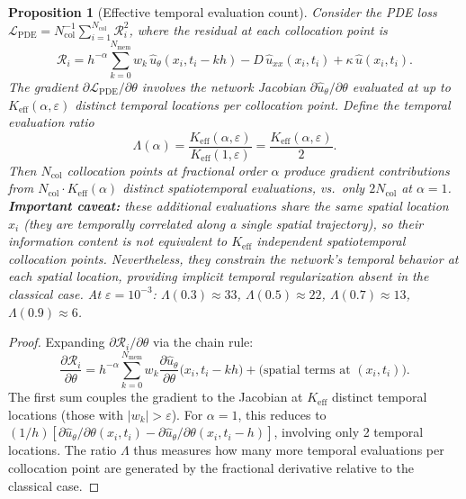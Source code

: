 \documentclass[preprint,12pt]{elsarticle}
\newtheorem{proposition}{Proposition}
\newcommand{\Lcal}{\mathcal{L}}
\newcommand{\Rcal}{\mathcal{R}}
\newcommand{\Ncol}{N_{\mathrm{col}}}
\begin{document}
\begin{proposition}[Effective temporal evaluation count]
\label{prop:amplification}
Consider the PDE loss $\Lcal_{\mathrm{PDE}} = \Ncol^{-1} \sum_{i=1}^{\Ncol} \Rcal_i^2$, where the residual at each collocation point is
\[
\Rcal_i = h^{-\alpha} \sum_{k=0}^{N_{\mathrm{mem}}} w_k\, \hat{u}_\theta(x_i, t_i - kh) - D\,\hat{u}_{xx}(x_i, t_i) + \kappa\,\hat{u}(x_i, t_i).
\]
The gradient $\partial \Lcal_{\mathrm{PDE}} / \partial \theta$ involves the network Jacobian $\partial \hat{u}_\theta / \partial \theta$ evaluated at up to $K_{\mathrm{eff}}(\alpha, \varepsilon)$ distinct temporal locations per collocation point. Define the \emph{temporal evaluation ratio}
\begin{equation}
\label{eq:lambda}
\Lambda(\alpha) = \frac{K_{\mathrm{eff}}(\alpha, \varepsilon)}{K_{\mathrm{eff}}(1, \varepsilon)} = \frac{K_{\mathrm{eff}}(\alpha, \varepsilon)}{2}.
\end{equation}
Then $\Ncol$ collocation points at fractional order $\alpha$ produce gradient contributions from $\Ncol \cdot K_{\mathrm{eff}}(\alpha)$ distinct spatiotemporal evaluations, vs.\ only $2\Ncol$ at $\alpha = 1$. \textbf{Important caveat:} these additional evaluations share the same spatial location $x_i$ (they are temporally correlated along a single spatial trajectory), so their information content is \emph{not} equivalent to $K_{\mathrm{eff}}$ independent spatiotemporal collocation points. Nevertheless, they constrain the network's temporal behavior at each spatial location, providing implicit temporal regularization absent in the classical case. At $\varepsilon = 10^{-3}$: $\Lambda(0.3) \approx 33$, $\Lambda(0.5) \approx 22$, $\Lambda(0.7) \approx 13$, $\Lambda(0.9) \approx 6$.
\end{proposition}

\begin{proof}
Expanding $\partial \Rcal_i / \partial \theta$ via the chain rule:
\[
\frac{\partial \Rcal_i}{\partial \theta} = h^{-\alpha} \sum_{k=0}^{N_{\mathrm{mem}}} w_k \frac{\partial \hat{u}_\theta}{\partial \theta}\bigl(x_i, t_i - kh\bigr) + \text{(spatial terms at }(x_i, t_i)\text{)}.
\]
The first sum couples the gradient to the Jacobian at $K_{\mathrm{eff}}$ distinct temporal locations (those with $|w_k| > \varepsilon$). For $\alpha = 1$, this reduces to $(1/h)[\partial \hat{u}_\theta/\partial\theta(x_i,t_i) - \partial \hat{u}_\theta/\partial\theta(x_i,t_i-h)]$, involving only 2 temporal locations. The ratio $\Lambda$ thus measures how many more temporal evaluations per collocation point are generated by the fractional derivative relative to the classical case.
\end{proof}
\end{document}
